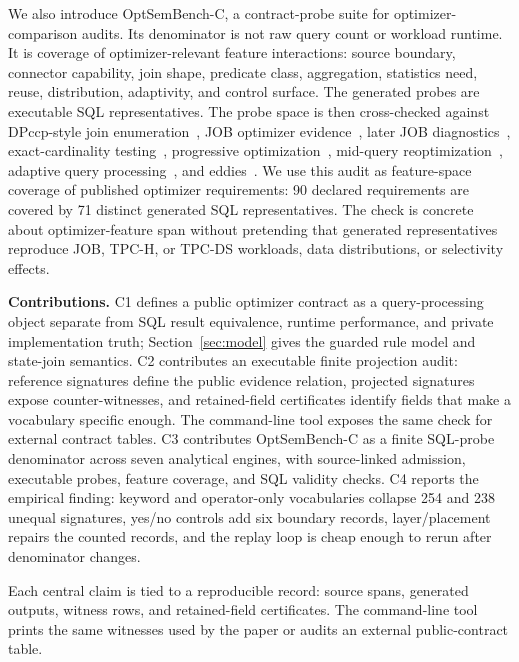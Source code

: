 We also introduce OptSemBench-C, a contract-probe suite for optimizer-comparison audits.  Its denominator is not raw query count or workload runtime.  It is coverage of optimizer-relevant feature interactions: source boundary, connector capability, join shape, predicate class, aggregation, statistics need, reuse, distribution, adaptivity, and control surface.  The generated probes are executable SQL representatives.  The probe space is then cross-checked against DPccp-style join enumeration~\cite{moerkotte2006dpccp}, JOB optimizer evidence~\cite{leis2015good}, later JOB diagnostics~\cite{leis2018looking}, exact-cardinality testing~\cite{chaudhuri2009exact}, progressive optimization~\cite{markl2004progressive}, mid-query reoptimization~\cite{kabra1998reoptimization}, adaptive query processing~\cite{deshpande2007adaptive}, and eddies~\cite{avnur2000eddies}.  We use this audit as feature-space coverage of published optimizer requirements: 90 declared requirements are covered by 71 distinct generated SQL representatives.  The check is concrete about optimizer-feature span without pretending that generated representatives reproduce JOB, TPC-H, or TPC-DS workloads, data distributions, or selectivity effects.

\textbf{Contributions.} C1 defines a public optimizer contract as a query-processing object separate from SQL result equivalence, runtime performance, and private implementation truth; Section~\ref{sec:model} gives the guarded rule model and state-join semantics.  C2 contributes an executable finite projection audit: reference signatures define the public evidence relation, projected signatures expose counter-witnesses, and retained-field certificates identify fields that make a vocabulary specific enough.  The command-line tool exposes the same check for external contract tables.  C3 contributes OptSemBench-C as a finite SQL-probe denominator across seven analytical engines, with source-linked admission, executable probes, feature coverage, and SQL validity checks.  C4 reports the empirical finding: keyword and operator-only vocabularies collapse 254 and 238 unequal signatures, yes/no controls add six boundary records, layer/placement repairs the counted records, and the replay loop is cheap enough to rerun after denominator changes.



Each central claim is tied to a reproducible record: source spans, generated outputs, witness rows, and retained-field certificates.  The command-line tool prints the same witnesses used by the paper or audits an external public-contract table.
